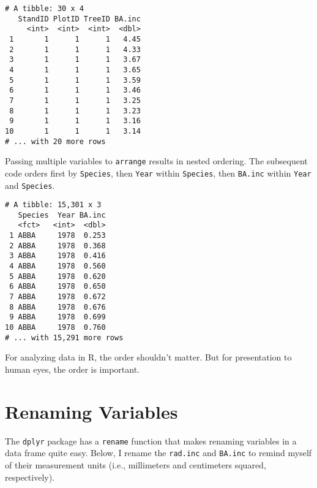 \documentclass[]{krantz}
\makeatletter
\newenvironment{Shaded}{\begin{snugshade}}{\end{snugshade}}
\newcommand{\KeywordTok}[1]{\textcolor[rgb]{0.27,0.27,0.27}{\textbf{#1}}}
\newcommand{\StringTok}[1]{\textcolor[rgb]{0.5,0.5,0.5}{#1}}
\newcommand{\OperatorTok}[1]{\textcolor[rgb]{0.43,0.43,0.43}{\textbf{#1}}}
\newcommand{\NormalTok}[1]{#1}
\newenvironment{kframe}{%
\medskip{}
\setlength{\fboxsep}{.8em}
 \def\at@end@of@kframe{}%
 \ifinner\ifhmode%
  \def\at@end@of@kframe{\end{minipage}}%
  \begin{minipage}{\columnwidth}%
 \fi\fi%
 \def\FrameCommand##1{\hskip\@totalleftmargin \hskip-\fboxsep
 \colorbox{shadecolor}{##1}\hskip-\fboxsep
     \hskip-\linewidth \hskip-\@totalleftmargin \hskip\columnwidth}%
 \MakeFramed {\advance\hsize-\width
   \@totalleftmargin\z@ \linewidth\hsize
   \@setminipage}}%
 {\par\unskip\endMakeFramed%
 \at@end@of@kframe}
\renewenvironment{Shaded}{\begin{kframe}}{\end{kframe}}
\theoremstyle{definition}
\theoremstyle{definition}
\theoremstyle{definition}
\theoremstyle{remark}
\makeatother
\begin{document}
\begin{verbatim}
# A tibble: 30 x 4
   StandID PlotID TreeID BA.inc
     <int>  <int>  <int>  <dbl>
 1       1      1      1   4.45
 2       1      1      1   4.33
 3       1      1      1   3.67
 4       1      1      1   3.65
 5       1      1      1   3.59
 6       1      1      1   3.46
 7       1      1      1   3.25
 8       1      1      1   3.23
 9       1      1      1   3.16
10       1      1      1   3.14
# ... with 20 more rows
\end{verbatim}

Passing multiple variables to \texttt{arrange} results in nested
ordering. The subsequent code orders first by \texttt{Species}, then
\texttt{Year} within \texttt{Species}, then \texttt{BA.inc} within
\texttt{Year} and \texttt{Species}.

\begin{Shaded}
\end{Shaded}

\begin{verbatim}
# A tibble: 15,301 x 3
   Species  Year BA.inc
   <fct>   <int>  <dbl>
 1 ABBA     1978  0.253
 2 ABBA     1978  0.368
 3 ABBA     1978  0.416
 4 ABBA     1978  0.560
 5 ABBA     1978  0.620
 6 ABBA     1978  0.650
 7 ABBA     1978  0.672
 8 ABBA     1978  0.676
 9 ABBA     1978  0.699
10 ABBA     1978  0.760
# ... with 15,291 more rows
\end{verbatim}

For analyzing data in R, the order shouldn't matter. But for
presentation to human eyes, the order is important.

\section{Renaming Variables}\label{renaming-variables}

The \texttt{dplyr} package has a \texttt{rename} function that makes
renaming variables in a data frame quite easy. Below, I rename the
\texttt{rad.inc} and \texttt{BA.inc} to remind myself of their
measurement units (i.e., millimeters and centimeters squared,
respectively).
\end{document}
